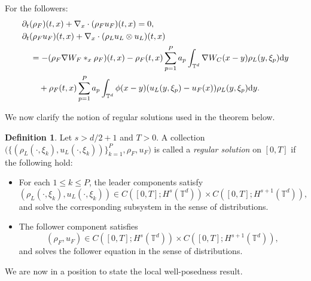 \documentclass[10pt, reqno]{amsart}
\theoremstyle{definition}
\newtheorem{definition}[theorem]{Definition}
\theoremstyle{remark}
\numberwithin{equation}{section}
\newcommand{\dy}{\textnormal{d}y}
\newcommand{\T}{\mathbb{T}}
\newcommand{\p}{\partial}
\begin{document}
For the followers:
\begin{equation} \label{eq: macmac followers dirac}
\begin{split}
    &\p_t (\rho_F)(t,x) + \nabla_x\cdot (\rho_F u_F)(t,x) = 0,\\
        &\p_t (\rho_F u_F)(t,x) + \nabla_x \cdot (\rho_L u_L \otimes u_L)(t,x) \\
        &\quad = -(\rho_F \nabla W_F *_x \rho_F)(t,x) - \rho_F(t,x) \sum_{p=1}^P a_p \int_{\T^{d}} \nabla W_C(x-y)\rho_L(y,\xi_p)\dy  \\
        &\qquad +\rho_F(t,x)\sum_{p=1}^P a_p \int_{\T^{d}} \phi(x-y)(u_L(y,\xi_p) - u_F(x)) \rho_L(y,\xi_p) \dy .
    \end{split}
\end{equation}
 

We now clarify the notion of regular solutions used in the theorem below.
\begin{definition}\label{def:reg-fluid-fluid}
Let $s > d/2 + 1$ and $T > 0$. A collection $\big(\{(\rho_L(\cdot,\xi_k), u_L(\cdot,\xi_k))\}_{k=1}^P, \rho_F, u_F\big)$ is called a \emph{regular solution} on $[0,T]$ if the following hold:
\begin{itemize}
    \item[(i)] For each $1 \le k \le P$, the leader components satisfy
    \[ (\rho_L(\cdot,\xi_k), u_L(\cdot,\xi_k)) \in C([0,T]; H^s(\mathbb{T}^d)) \times C([0,T]; H^{s+1}(\mathbb{T}^d)), \]
    and solve the corresponding subsystem in the sense of distributions.

    \item[(ii)] The follower component satisfies
    \[ (\rho_F, u_F) \in C([0,T]; H^s(\mathbb{T}^d)) \times C([0,T]; H^{s+1}(\mathbb{T}^d)), \]
    and solves the follower equation in the sense of distributions.
\end{itemize}
\end{definition}

We are now in a position to state the local well-posedness result.
\end{document}
